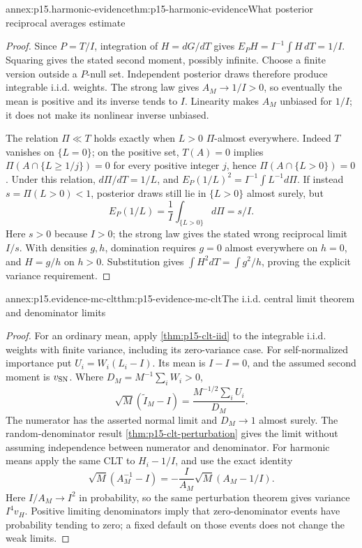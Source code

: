 \begin{annexitem}{annex:p15.harmonic-evidence}{thm:p15-harmonic-evidence}{What posterior reciprocal averages estimate}
\begin{proof}
Since \(P=T/I\), integration of \(H=dG/dT\) gives
\(E_PH=I^{-1}\int H\,dT=1/I\). Squaring gives the stated second
moment, possibly infinite. Choose a finite version outside a \(P\)-null
set. Independent posterior draws therefore produce integrable i.i.d.
weights. The strong law gives \(A_M\to1/I>0\), so eventually the
mean is positive and its inverse tends to \(I\).
Linearity makes \(A_M\) unbiased for \(1/I\); it does not make its
nonlinear inverse unbiased.

The relation \(\Pi\ll T\) holds exactly when \(L>0\) \(\Pi\)-almost
everywhere. Indeed \(T\) vanishes on \(\{L=0\}\); on the positive set,
\(T(A)=0\) implies \(\Pi(A\cap\{L\geq1/j\})=0\) for every positive
integer \(j\), hence \(\Pi(A\cap\{L>0\})=0\). Under this relation,
\(d\Pi/dT=1/L\), and
\(E_P(1/L)^2=I^{-1}\int L^{-1}d\Pi\).
If instead \(s=\Pi(L>0)<1\), posterior draws still lie in \(\{L>0\}\)
almost surely, but
\[
 E_P(1/L)=\frac1I\int_{\{L>0\}}d\Pi=s/I.
\]
Here \(s>0\) because \(I>0\); the strong law gives the stated wrong
reciprocal limit \(I/s\). With densities \(g,h\), domination requires
\(g=0\) almost everywhere on \(h=0\), and \(H=g/h\) on \(h>0\).
Substitution gives \(\int H^2dT=\int g^2/h\), proving the explicit
variance requirement.
\end{proof}
\end{annexitem}

\begin{annexitem}{annex:p15.evidence-mc-clt}{thm:p15-evidence-mc-clt}{The i.i.d. central limit theorem and denominator limits}
\begin{proof}
For an ordinary mean, apply \cref{thm:p15-clt-iid} to the integrable
i.i.d. weights with finite variance, including its zero-variance case.
For self-normalized importance put \(U_i=W_i(L_i-I)\). Its mean is
\(I-I=0\), and the assumed second moment is \(v_{\rm SN}\).
Where \(D_M=M^{-1}\sum_iW_i>0\),
\[
 \sqrt M(\widetilde I_M-I)=\frac{M^{-1/2}\sum_iU_i}{D_M}.
\]
The numerator has the asserted normal limit and \(D_M\to1\) almost
surely. The random-denominator result \cref{thm:p15-clt-perturbation}
gives the limit without assuming independence between numerator and
denominator. For harmonic means apply the same CLT to
\(H_i-1/I\), and use the exact identity
\[
 \sqrt M(A_M^{-1}-I)=-\frac{I}{A_M}\sqrt M(A_M-1/I).
\]
Here \(I/A_M\to I^2\) in probability, so the same perturbation theorem
gives variance \(I^4v_H\). Positive limiting denominators imply that
zero-denominator events have probability tending to zero; a fixed default
on those events does not change the weak limits.
\end{proof}
\end{annexitem}


